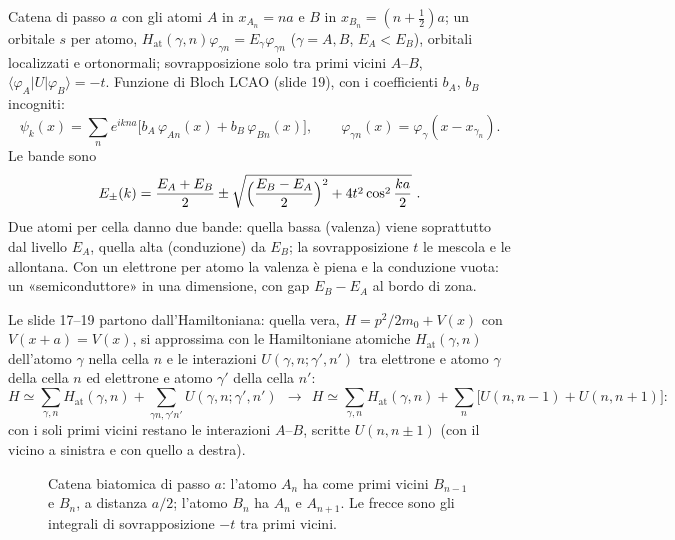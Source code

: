 \documentclass[11pt,a4paper]{article}
\begin{document}
\begin{modello}\label{mod:biat}
Catena di passo $a$ con gli atomi $A$ in $x_{A_n}=na$ e $B$ in $x_{B_n}=(n+\frac12)a$; un orbitale $s$ per atomo,
$H_{\mathrm{at}}(\gamma,n)\varphi_{\gamma n}=E_\gamma\varphi_{\gamma n}$ ($\gamma=A,B$, $E_A<E_B$), orbitali localizzati e ortonormali; sovrapposizione
solo tra primi vicini $A$--$B$, $\langle\varphi_{A}|U|\varphi_{B}\rangle=-t$. Funzione di Bloch LCAO (slide 19), con i coefficienti $b_A$, $b_B$
incogniti:
\[
\psi_k(x)=\sum_ne^{ikna}\bigl[b_A\,\varphi_{An}(x)+b_B\,\varphi_{Bn}(x)\bigr],\qquad \varphi_{\gamma n}(x)=\varphi_\gamma(x-x_{\gamma_n}).
\]
Le bande sono
\[
E_\pm(k)=\frac{E_A+E_B}2\pm\sqrt{\Bigl(\frac{E_B-E_A}2\Bigr)^2+4t^2\cos^2\frac{ka}2}\ .
\]
\tcblower
Due atomi per cella danno due bande: quella bassa (valenza) viene soprattutto dal livello $E_A$, quella alta (conduzione) da $E_B$; la sovrapposizione
$t$ le mescola e le allontana. Con un elettrone per atomo la valenza è piena e la conduzione vuota: un «semiconduttore» in una dimensione, con gap
$E_B-E_A$ al bordo di zona.
\end{modello}
Le slide 17--19 partono dall'Hamiltoniana: quella vera, $H=p^2/2m_0+V(x)$ con $V(x+a)=V(x)$, si approssima con le Hamiltoniane atomiche $H_{\mathrm{at}}(\gamma,n)$
dell'atomo $\gamma$ nella cella $n$ e le interazioni $U(\gamma,n;\gamma',n')$ tra elettrone e atomo $\gamma$ della cella $n$ ed elettrone e atomo
$\gamma'$ della cella $n'$:
\[
H\simeq\sum_{\gamma,n}H_{\mathrm{at}}(\gamma,n)+\sum_{\gamma n,\gamma'n'}U(\gamma,n;\gamma',n')\ \ \longrightarrow\ \
H\simeq\sum_{\gamma,n}H_{\mathrm{at}}(\gamma,n)+\sum_n\bigl[U(n,n-1)+U(n,n+1)\bigr]:
\]
con i soli primi vicini restano le interazioni $A$--$B$, scritte $U(n,n\pm1)$ (con il vicino a sinistra e con quello a destra).

\begin{figure}[tbp]
\centering
{}
\caption{Catena biatomica di passo $a$: l'atomo $A_n$ ha come primi vicini $B_{n-1}$ e $B_n$, a distanza $a/2$; l'atomo $B_n$ ha $A_n$ e $A_{n+1}$.
Le frecce sono gli integrali di sovrapposizione $-t$ tra primi vicini.}\label{fig:catena}
\end{figure}
\end{document}
